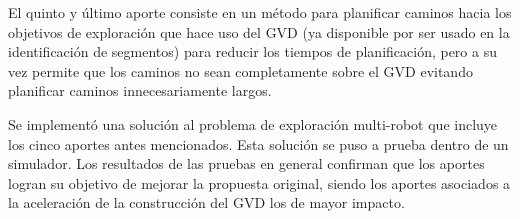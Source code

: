 El quinto y último aporte consiste en un método para planificar caminos hacia
los objetivos de exploración que hace uso del GVD (ya disponible por ser usado
en la identificación de segmentos) para reducir los tiempos de planificación,
pero a su vez permite que los caminos no sean completamente sobre el GVD evitando
planificar caminos innecesariamente largos.

Se implementó una solución al problema de exploración multi-robot que incluye
los cinco aportes antes mencionados. Esta solución se puso a prueba dentro de un
simulador. Los resultados de las pruebas en general confirman que los aportes
logran su objetivo de mejorar la propuesta original, siendo los aportes 
asociados a la aceleración de la construcción del GVD los de mayor impacto.

